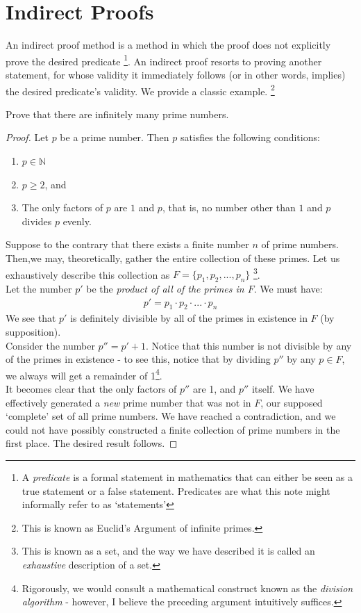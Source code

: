 \documentclass[../proofs.tex]{subfiles}
\begin{document}
\chapter{Indirect Proofs}
An indirect proof method is a method in which the proof does not explicitly prove the desired predicate \footnote{A \emph{predicate} is a formal statement in mathematics that can either be seen as a true statement or a false statement. Predicates are what this note might informally refer to as `statements'}. An indirect proof resorts to proving another statement, for whose validity it immediately follows (or in other words, implies) the desired predicate's validity. We provide a classic example. \footnote{This is known as Euclid's Argument of infinite primes.} \\

\begin{expl}{Prove that there are infinitely many prime numbers.}
\begin{proof}
  Let $p$ be a prime number. Then $p$ satisfies the following conditions:
    \begin{enumerate}
      \item $p \in \mathbb{N}$
      \item $p \geq 2$, and
      \item The only factors of $p$ are $1$ and $p$, that is, no number other than $1$ and $p$ divides $p$ evenly.
    \end{enumerate}
  Suppose to the contrary that there exists a finite number $n$ of prime numbers. \\
  Then,we may, theoretically, gather the entire collection of these primes. Let us exhaustively describe this collection as $F = \{p_1, p_2, ..., p_n\}$ \footnote{This is known as a set, and the way we have described it is called an \emph{exhaustive} description of a set.}. \\
  Let the number $p'$ be the \emph{product of all of the primes in $F$}. We must have:
  \begin{align*}
    p' = p_1 \cdot p_2 \cdot ... \cdot p_n
  \end{align*}
  We see that $p'$ is definitely divisible by all of the primes in existence in $F$ (by supposition). \\
  Consider the number $p''  = p' + 1$. Notice that this number is not divisible by any of the primes in existence - to see this, notice that by dividing $p'' $ by any $p \in F$, we always will get a remainder of 1\footnote{Rigorously, we would consult a mathematical construct known as the \emph{division algorithm} - however, I believe the preceding argument intuitively suffices.}.\\

  It becomes clear that the only factors of $p''$ are 1, and $p''$ itself. We have effectively generated a \emph{new} prime number that was not in $F$, our supposed `complete' set of all prime numbers. We have reached a contradiction, and we could not have possibly constructed a finite collection of prime numbers in the first place. The desired result follows.
  \end{proof}
\end{expl}
\end{document}
